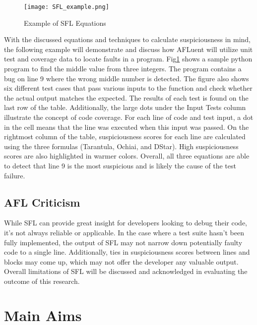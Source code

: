 \begin{figure}[!htb]
	\begin{center}
		\texttt{[image: SFL\_example.png]}
		\caption{\label{fig:sfl_example} Example of SFL Equations}
	\end{center}
\end{figure}

With the discussed equations and techniques to calculate suspiciousness in mind,
the following example will demonstrate and discuss how AFLuent will utilize unit
test and coverage data to locate faults in a program. Fig\ref{fig:sfl_example}
shows a sample python program to find the middle value
from three integers. The program contains a bug on line 9 where the wrong middle
number is detected. The figure also shows six different test cases that pass
various inputs to the function and check whether the actual output matches the
expected. The results of each test is found on the last row of the table.
Additionally, the large dots under the Input Tests column illustrate the concept
of code coverage. For each line of code and test input, a dot in the cell means
that the line was executed when this input was passed. On the rightmost column
of the table, suspiciousness scores for each line are calculated using the three
formulas (Tarantula, Ochiai, and DStar). High suspiciousness scores are also
highlighted in warmer colors. Overall, all three equations are able to detect
that line 9 is the most suspicious and is likely the cause of the test failure.

\subsection{AFL Criticism}
\label{subsec:Criticism}

While SFL can provide great insight for developers looking to debug their code,
it's not always reliable or applicable. In the case where a test suite hasn't
been fully implemented, the output of SFL may not narrow down potentially faulty
code to a single line. Additionally, ties in suspiciousness scores between lines
and blocks may come up, which may not offer the developer any valuable output.
Overall limitations of SFL will be discussed and acknowledged
in evaluating the outcome of this research.


\section{Main Aims}
\label{sec:aims}

